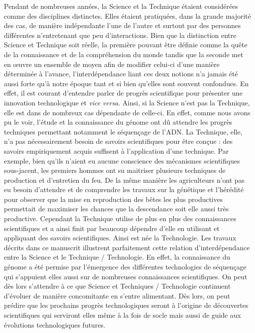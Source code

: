 \documentclass[12pt,twoside]{ugathesis}
\begin{document}
Pendant de nombreuses années, la Science et la Technique étaient
considérées comme des disciplines distinctes. Elles étaient pratiquées,
dans la grande majorité des cas, de manière indépendante l'une de
l'autre et surtout par des personnes différentes n'entretenant que peu
d'interactions. Bien que la distinction entre Science et Technique soit
réelle, la première pouvant être définie comme la quête de la
connaissance et de la compréhension du monde tandis que la seconde met
en œuvre un ensemble de moyen afin de modifier celui-ci d'une manière
déterminée à l'avance, l'interdépendance liant ces deux notions n'a
jamais été aussi forte qu'à notre époque tant et si bien qu'elles sont
souvent confondues. En effet, il est courant d'entendre parler de
progrès scientifique pour présenter une innovation technologique et
\emph{vice versa}. Ainsi, si la Science n'est pas la Technique, elle est
dans de nombreux cas dépendante de celle-ci. En effet, comme nous avons
pu le voir, l'étude et la connaissance du génome ont dû attendre les
progrès techniques permettant notamment le séquençage de l'ADN. La
Technique, elle, n'a pas nécessairement besoin de savoirs scientifiques
pour être conçue : des savoirs empiriquement acquis suffisent à
l'application d'une technique. Par exemple, bien qu'ils n'aient eu
aucune conscience des mécanismes scientifiques sous-jacent, les premiers
hommes ont su maitriser plusieurs techniques de production et
d'entretien du feu. De la même manière les agriculteurs n'ont pas eu
besoin d'attendre et de comprendre les travaux sur la génétique et
l'hérédité pour observer que la mise en reproduction des bêtes les plus
productives permettait de maximiser les chances que la descendance soit
elle aussi très productive. Cependant la Technique utilise de plus en
plus des connaissances scientifiques et a ainsi finit par beaucoup
dépendre d'elle en utilisant et appliquant des savoirs scientifiques.
Ainsi est née la Technologie. Les travaux décrits dans ce manuscrit
illustrent parfaitement cette relation d'interdépendance entre la
Science et le Technique / Technologie. En effet, la connaissance du
génome a été permise par l'émergence des différentes technologies de
séquençage qui s'appuient elles aussi sur de nombreuses connaissances
scientifiques. On peut dès lors s'attendre à ce que Science et
Techniques / Technologie continuent d'évoluer de manière concomitante en
s'entre alimentant. Dès lors, on peut prédire que les prochains progrès
technologiques seront à l'origine de découvertes scientifiques qui
serviront elles même à la fois de socle mais aussi de guide aux
évolutions technologiques futures.
\end{document}
